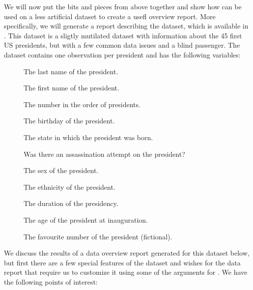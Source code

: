\documentclass[article,shortnames]{jss}
\begin{document}
We will now put the bits and pieces from above together and show how  can be used on a less artificial dataset to create a usefl overview report. More specifically, we will generate a report describing the  dataset, which is available in . This dataset is a sligtly mutilated dataset with information about the 45 first US presidents, but with a few common data issues and a blind passenger. The dataset contains one observation per president and has the following variables:
\begin{description}
\item[] The last name of the president.
\item[] The first name of the president.
\item[] The number in the order of presidents.
\item[] The birthday of the president.
\item[] The state in which the president was born.
\item[] Was there an assassination attempt on the president?
\item[] The sex of the president.
\item[] The ethnicity of the president.
\item[] The duration of the presidency.
\item[] The age of the president at inauguration.
\item[] The favourite number of the president (fictional).
\end{description}
We discuss the results of a data overview report generated for this dataset below, but first there are a few special features of the dataset and wishes for the data report that require us to customize it using some of the arguments for . We have the following points of interest:
\end{document}
